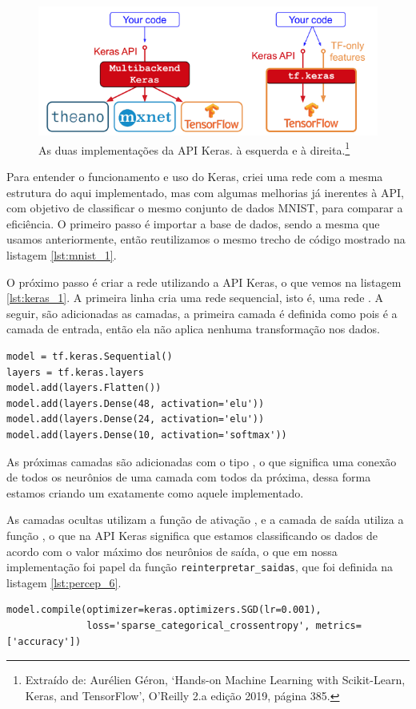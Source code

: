 \begin{figure}[htb]
\centering
\includegraphics[width=12cm]{figuras/tensor_flow}
\caption{As duas implementações da API Keras.  à esquerda e  à direita.\footnote{Extraído de: Aurélien Géron, `Hands-on Machine Learning with Scikit-Learn, Keras, and TensorFlow', O'Reilly 2.a edição 2019, página 385.}}
\label{fig:tensor_flow}
\end{figure}

Para entender o funcionamento e uso do Keras, criei uma rede com a mesma estrutura do  aqui implementado, mas com algumas melhorias já inerentes à API, com objetivo de classificar o mesmo conjunto de dados MNIST, para comparar a eficiência. O primeiro passo é importar a base de dados, sendo a mesma que usamos anteriormente, então reutilizamos o mesmo trecho de código mostrado na listagem \ref{lst:mnist_1}.

O próximo passo é criar a rede utilizando a API Keras, o que vemos na listagem \ref{lst:keras_1}. A primeira linha cria uma rede sequencial, isto é, uma rede . A seguir, são adicionadas as camadas, a primeira camada é definida como  pois é a camada de entrada, então ela não aplica nenhuma transformação nos dados.
\newline
\estiloR
\begin{lstlisting}[caption={Trecho do script \eng{mnist\_keras.py}},label={lst:keras_1},escapeinside={\%}]
model = tf.keras.Sequential()
layers = tf.keras.layers
model.add(layers.Flatten())
model.add(layers.Dense(48, activation='elu'))
model.add(layers.Dense(24, activation='elu'))
model.add(layers.Dense(10, activation='softmax'))
\end{lstlisting}


As próximas camadas são adicionadas com o tipo , o que significa uma conexão de todos os neurônios de uma camada com todos da próxima, dessa forma estamos criando um  exatamente como aquele implementado. 

As camadas ocultas utilizam a função de ativação , e a camada de saída utiliza a função , o que na API Keras significa que estamos classificando os dados de acordo com o valor máximo dos neurônios de saída, o que em nossa implementação foi papel da função \texttt{reinterpretar\_saidas}, que foi definida na listagem \ref{lst:percep_6}.
\newpage
\estiloR
\begin{lstlisting}[caption={Trecho do script \eng{mnist\_keras.py}},label={lst:keras_2},escapeinside={\%}]
model.compile(optimizer=keras.optimizers.SGD(lr=0.001),
              loss='sparse_categorical_crossentropy', metrics=['accuracy'])
\end{lstlisting}

